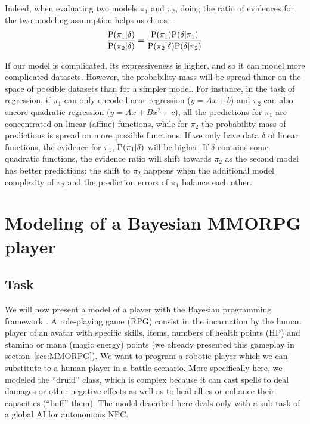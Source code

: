 Indeed, when evaluating two models $\pi_1$ and $\pi_2$, doing the ratio of evidences for the two modeling assumption helps us choose:
\begin{equation}
\frac{\mathrm{P}(\pi_1 | \delta)}{\mathrm{P}(\pi_2 | \delta)} = \frac{\mathrm{P}(\pi_1) \mathrm{P}(\delta| \pi_1)}{\mathrm{P}(\pi_2 | \delta) \mathrm{P}(\delta | \pi_2)}
\end{equation}

If our model is complicated, its expressiveness is higher, and so it can model more complicated datasets. However, the probability mass will be spread thiner on the space of possible datasets than for a simpler model. For instance, in the task of regression, if $\pi_1$ can only encode linear regression ($y = Ax + b$) and $\pi_2$ can also encore quadratic regression ($y = Ax + Bx^2 + c$), all the predictions for $\pi_1$ are concentrated on linear (affine) functions, while for $\pi_2$ the probability mass of predictions is spread on more possible functions. If we only have data $\delta$ of linear functions, the evidence for $\pi_1$, $\mathrm{P}(\pi_1|\delta)$ will be higher. If $\delta$ contains some quadratic functions, the evidence ratio will shift towards $\pi_2$ as the second model has better predictions: the shift to $\pi_2$ happens when the additional model complexity of $\pi_2$ and the prediction errors of $\pi_1$ balance each other.



\section{Modeling of a Bayesian MMORPG player}
\subsection{Task}

We will now present a model of a  player with the Bayesian programming framework \citep{SYNNAEVE:MMORPG}. A role-playing game (RPG) consist in the incarnation by the human player of an avatar with specific skills, items, numbers of health points (HP) and stamina or mana (magic energy) points (we already presented this gameplay in section~\ref{sec:MMORPG}). We want to program a robotic player which we can substitute to a human player in a battle scenario. More specifically here, we modeled the ``druid'' class, which is complex because it can cast spells to deal damages or other negative effects as well as to heal allies or enhance their capacities (``buff'' them). The model described here deals only with a sub-task of a global AI for autonomous NPC. 

